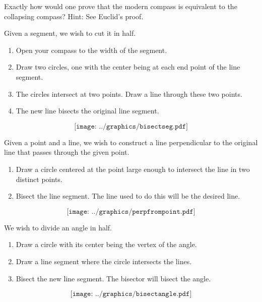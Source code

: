 \begin{question} Exactly how would one prove that the modern compass is equivalent 
to the collapsing compass? Hint: See Euclid's proof.
\end{question}
\QM


\begin{construction} 
Given a segment, we wish to cut it in half.
\begin{enumerate}
\item Open your compass to the width of the segment.
\item Draw two circles, one with the center being at each end point 
of the line segment.
\item The circles intersect at two points.  Draw a line through 
these two points.
\item The new line bisects the original line segment.
\end{enumerate}
\[
\texttt{[image: ../graphics/bisectseg.pdf]}
\]
\end{construction}

\begin{construction}  
Given a point and a line, we wish to construct a line perpendicular to
the original line that passes through the given point.
\begin{enumerate}
\item Draw a circle centered at the point large enough  
       to intersect the line in two distinct points.
\item Bisect the line segment. The line used to do this 
       will be the desired line.
\end{enumerate}
\[
\texttt{[image: ../graphics/perpfrompoint.pdf]}
\]
\end{construction}





\begin{construction} 
We wish to divide an angle in half.
\begin{enumerate}
\item Draw a circle with its center being the vertex of the 
angle.
\item Draw a line segment where the circle intersects the lines.
\item Bisect the new line segment.  The bisector will bisect the angle.
\end{enumerate}
\[
\texttt{[image: ../graphics/bisectangle.pdf]}
\]
\end{construction}


